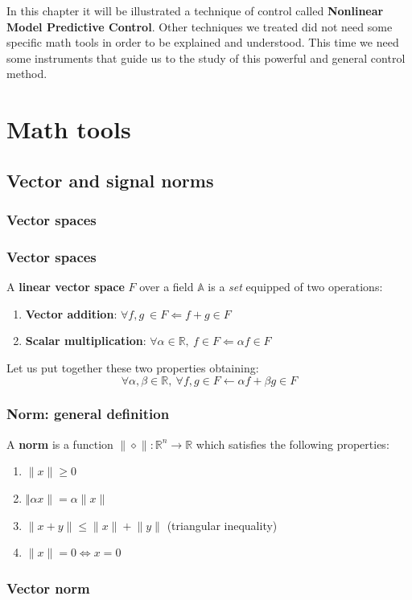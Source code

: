 In this chapter it will be illustrated a technique of control called \textbf{Nonlinear Model Predictive Control}. Other techniques we treated did not need some specific math tools in order to be explained and understood. This time we need some instruments that guide us to the study of this powerful and general control method.

\section{Math tools}
\subsection{Vector and signal norms}

{\color{blue} \subsubsection{Vector spaces}
}
\subsubsection{Vector spaces}
A \textbf{linear vector space } $F$ over a field $\mathbb{A}$ is a \textit{set} equipped of two operations: 
\begin{enumerate}
    \item \textbf{Vector addition}: $\forall f, g \ \in F \Leftarrow f+g\in F$
    \item \textbf{Scalar multiplication}: $\forall \alpha\in \mathbb{R}, \ f \in F \Leftarrow \alpha f \in F$
\end{enumerate}
Let us put together these two properties obtaining: 
{
\large{
    \begin{equation*}
    \forall \alpha, \beta \in \mathbb{R}, \ \forall f, g \in F \leftarrow 
    \alpha f + \beta g \in F
\end{equation*}
}
}
{\color{blue} \subsubsection{Norm: general definition} }

A \textbf{norm} is a function $\lVert  \diamond \rVert : \mathbb{R}^n\rightarrow\mathbb{R}$ which satisfies the following properties: 
\begin{enumerate}
    \item $\lVert x \rVert \ge 0$
    \item $ \Vert \alpha x \rVert = \alpha \lVert x \rVert$
    \item $\lVert x+y \rVert \le \lVert x \rVert + \lVert y \rVert $ (triangular inequality)
    \item $\lVert x \rVert=0 \Longleftrightarrow x=0$
\end{enumerate}
{\color{blue} \subsubsection{Vector norm}}

